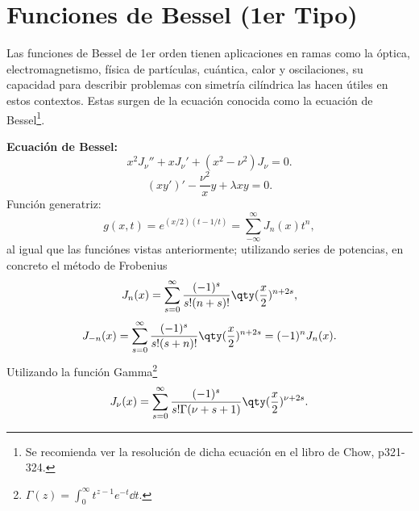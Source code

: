 \section*{Funciones de Bessel (1er Tipo)}

Las funciones de Bessel de 1er orden tienen aplicaciones en ramas como la óptica, electromagnetismo, física de partículas, cuántica, calor y oscilaciones, su capacidad para describir problemas con simetría cilíndrica las hacen útiles en estos contextos. Estas surgen de la ecuación conocida como la ecuación de Bessel\footnote{Se recomienda ver la resolución de dicha ecuación en el libro de Chow, p321-324.}.

\begin{mdframed}[style=warning]
	{\Large \textbf{Ecuación de Bessel:}} \\
		$$ x^2 J_\nu '' + xJ_\nu ' + (x^2 - \nu ^2) J_\nu = 0. $$
		$$ (xy')' - \frac{\nu ^2}{x} y + \lambda xy = 0. $$	
	Función generatriz:
		$$ g(x,t) = e^{(x/2)(t - 1/t)} = \sum _{-\infty} ^\infty J_n (x) t^n , $$
	al igual que las funciónes vistas anteriormente; utilizando series de potencias, en concreto el método de Frobenius
		$$ J_n (x) = \sum _{s = 0} ^\infty \frac{(-1)^s}{s! (n + s)!} \qty(\frac{x}{2})^{n + 2s}, $$
		$$ J_{-n} (x) = \sum _{s = 0} ^\infty \frac{(-1)^s}{s! (s + n)!} \qty(\frac{x}{2})^{n +2s} = (-1)^n J_n (x). $$
	Utilizando la función Gamma\footnote{$\Gamma (z) = \int _0 ^\infty t^{z - 1} e^{-t} \dd{t}$.}
		$$ J_\nu (x) = \sum _{s = 0} ^\infty \frac{(-1)^s}{s! \Gamma (\nu + s + 1)} \qty(\frac{x}{2})^{\nu + 2s}. $$
\end{mdframed}


